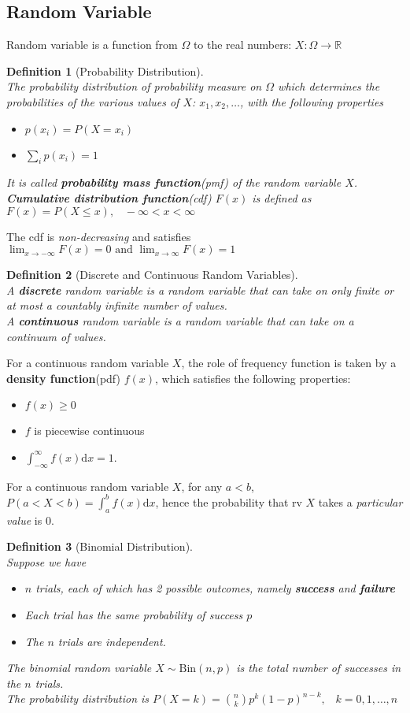 \documentclass[12pt]{article}
\newcommand{\diff}{\mathrm{d}}
\newcommand{\bin}{\mathrm{Bin}}
\newtheorem{definition}{Definition}[section]
\theoremstyle{definition}
\begin{document}
\subsection{Random Variable}
Random variable is a function from $\Omega$ to the real numbers:
$
X: \Omega \to \mathbb{R}
$
\begin{definition}[Probability Distribution]
\hfill\\\normalfont The probability distribution of probability measure on $\Omega$ which determines the probabilities of the various values of $X$: $x_1, x_2,\ldots$, with the following properties
\begin{itemize}
  \item $p(x_i)=P(X=x_i)$
  \item $\sum_{i} p(x_i)=1$
\end{itemize}
It is called \textbf{probability mass function}(pmf) of the random variable $X$.\\
\textbf{Cumulative distribution function}(cdf) $F(x)$ is defined as 
$
F(x) = P(X\leq x), \;\;\;-\infty<x<\infty
$
\end{definition}
The cdf is \textit{non-decreasing} and satisfies
$
\lim_{x\to -\infty} F(x)=0\text{   and   }\lim_{x\to \infty} F(x)=1
$
\begin{definition}[Discrete and Continuous Random Variables]
\hfill\\\normalfont A \textbf{discrete} random variable is a random variable that can take on only finite or at most a countably infinite number of values.\\
A \textbf{continuous} random variable is a random variable that can take on a continuum of values.
\end{definition}
For a continuous random variable $X$, the role of frequency function is taken by a \textbf{density function}(pdf) $f(x)$, which satisfies the following properties:
\begin{itemize}
  \item $f(x)\geq 0$
  \item $f$ is piecewise continuous
  \item $\int_{-\infty}^{\infty} f(x)\diff x=1$.
\end{itemize}
For a continuous random variable $X$, for any $a<b$, $P(a<X<b)=\int_a^b f(x)\diff x$, hence the probability that rv $X$ takes a \textit{particular value} is $0$.
\begin{definition}[Binomial Distribution]
\hfill\\\normalfont Suppose we have
\begin{itemize}
  \item $n$ trials, each of which has 2 possible outcomes, namely \textbf{success} and \textbf{failure}
  \item Each trial has the same probability of success $p$
  \item The $n$ trials are independent.
\end{itemize}
The binomial random variable $X\sim \bin(n,p)$ is the total number of successes in the $n$ trials. \\
The probability distribution is
$
P(X=k)=\binom{n}{k} p^k(1-p)^{n-k},\;\;\;k=0,1,\ldots, n
$
\end{definition}
\end{document}
